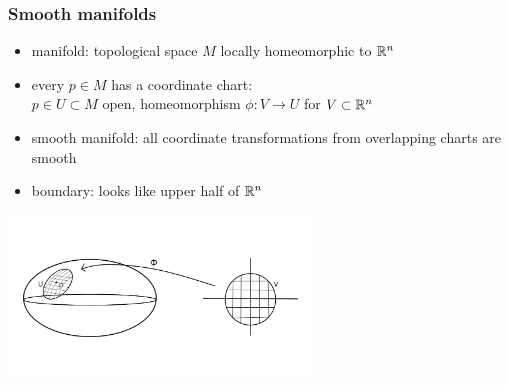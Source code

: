 \begin{frame}
  \frametitle{Smooth manifolds}
  \begin{itemize}
    \item manifold:  topological space $M$ locally homeomorphic to $\mathbb{R}^n$

    \item every $p\in M$ has a coordinate chart:\\$p\in U\subset M$ open, homeomorphism $\phi\colon V\to U$ for $V\subset \mathbb{R}^n$

    \item smooth manifold: all coordinate transformations from overlapping charts are smooth
    \item boundary: looks like upper half of $\mathbb{R}^n$
  \end{itemize}
  \includegraphics[width=8cm]{images/surface_with_chart.png}
\end{frame}

